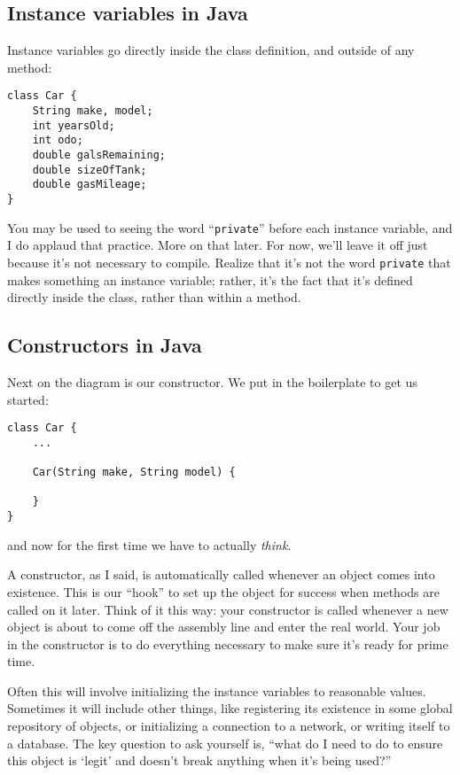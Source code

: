\subsection{Instance variables in Java}

Instance variables go directly inside the class definition, and outside of any
method:

\begin{Verbatim}[samepage=true,fontsize=\footnotesize,frame=single]
class Car {
    String make, model;
    int yearsOld;
    int odo;
    double galsRemaining;
    double sizeOfTank;
    double gasMileage;    
}
\end{Verbatim}

You may be used to seeing the word ``\texttt{private}'' before each instance
variable, and I do applaud that practice. More on that later. For now, we'll
leave it off just because it's not necessary to compile. Realize that it's not
the word \texttt{private} that makes something an instance variable; rather,
it's the fact that it's defined directly inside the class, rather than within
a method.

\subsection{Constructors in Java}

Next on the diagram is our constructor. We put in the boilerplate to get us
started:

\begin{Verbatim}[samepage=true,fontsize=\footnotesize,frame=single]
class Car {
    ...

    Car(String make, String model) {

    }
}
\end{Verbatim}

and now for the first time we have to actually \textit{think}.

A constructor, as I said, is automatically called whenever an object comes
into existence. This is our ``hook'' to set up the object for success when
methods are called on it later. Think of it this way: your constructor is
called whenever a new object is about to come off the assembly line and enter
the real world. Your job in the constructor is to do everything necessary to
make sure it's ready for prime time.

Often this will involve initializing the instance variables to reasonable
values. Sometimes it will include other things, like registering its existence
in some global repository of objects, or initializing a connection to a
network, or writing itself to a database. The key question to ask yourself is,
``what do I need to do to ensure this object is `legit' and doesn't break
anything when it's being used?''

